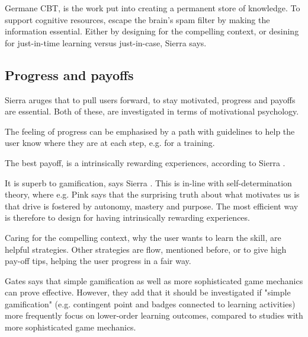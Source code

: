 Germane CBT, is the work put into creating a permanent store of knowledge. To support cognitive resources, escape the brain's spam filter by making the information essential. Either by designing for the compelling context, or desining for just-in-time learning versus just-in-case, Sierra says. \cite{sierra}

\subsection{Progress and payoffs}

Sierra aruges that to pull users forward, to stay motivated, progress and payoffs are essential. Both of these, are investigated in terms of motivational psychology.

The feeling of progress can be emphasised by a path with guidelines to help the user know where they are at each step, e.g. for a training.

The best payoff, is a intrinsically rewarding experiences, according to Sierra \cite{sierra}.

It is superb to gamification, says Sierra \cite{sierra}. This is in-line with self-determination theory, where e.g. Pink \cite{pink} says that the surprising truth about what motivates us is that drive is fostered by autonomy, mastery and purpose. The most efficient way is therefore to design for having intrinsically rewarding experiences.

Caring for the compelling context, why the user wants to learn the skill, are helpful strategies. Other strategies are flow, mentioned before, or to give high pay-off tips, helping the user progress in a fair way.

Gates \cite{sierra} says that simple gamification as well as more sophisticated game mechanics can prove effective. However, they add that it should be investigated if "simple gamification" (e.g. contingent point and badges connected to learning activities) more frequently focus on lower-order learning outcomes, compared to studies with more sophisticated game mechanics.
